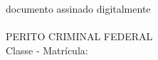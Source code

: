 \bigskip
\begin{center}
	documento assinado digitalmente\\
	\bigskip
	\textbf{\MakeUppercase{\pfauthor}}\\
	PERITO CRIMINAL FEDERAL\\
	Classe \pfauthorclass\space - Matrícula: \pfauthormatr
\end{center}
